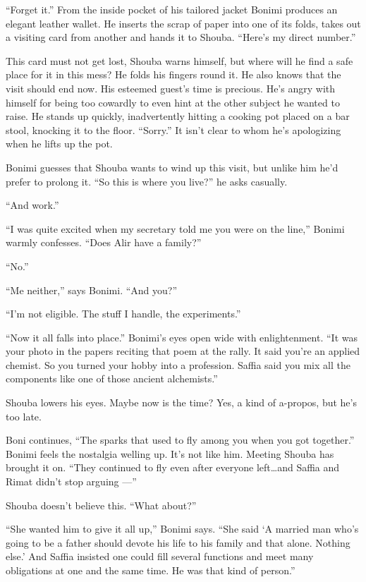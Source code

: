 \documentclass[twoside,11pt,openany]{book}
\begin{document}
``Forget it.'' From the inside pocket of his tailored jacket Bonimi produces an elegant
leather wallet. He inserts the scrap of paper into one of its folds, takes out a visiting card from another and hands
it to Shouba. ``Here's my direct number.''

This card must not get lost, Shouba warns himself, but where will he find a safe place for it in this mess? He folds his
fingers round it. He also knows that the visit should end now. His esteemed guest's time is precious.
He's{ }angry with himself for being too cowardly to even hint at the other
subject he wanted to raise. He stands up quickly, inadvertently hitting a cooking pot placed on a bar stool, knocking
it to the floor. ``Sorry.'' It isn't clear to whom he's apologizing when he lifts up the
pot.

Bonimi guesses that Shouba wants to wind up this visit, but unlike him he'd prefer to prolong it. ``So this
is where you live?''  he asks casually.

``And work.''

``I was quite excited when my secretary told me you were on the line,'' Bonimi warmly
confesses. ``Does Alir have a family?''

``No.''

``Me neither,'' says Bonimi. ``And you?''

``I'm not eligible. The stuff I handle, the experiments.''

``Now it all falls into place.'' Bonimi's eyes open wide with enlightenment. ``It
was your photo in the papers reciting that poem at the rally. It said you're an applied chemist. So you turned your
hobby into a profession. Saffia said you mix all the components like one of those ancient alchemists.''

Shouba lowers his eyes. Maybe now is the time? Yes, a kind of \hbox{a-propos},
but he's too late.

Boni continues, ``The sparks that used to fly among you when you got together.'' Bonimi feels
the nostalgia welling up. It's not like him. Meeting Shouba has brought it on. ``They continued to fly
even after everyone left{\ldots}and Saffia and Rimat didn't stop arguing ---''

Shouba doesn't believe this. ``What about?''

``She wanted {him} to give it all up,'' Bonimi says. ``She said
`A married man who's going to be a father should devote his life to his family and that alone. Nothing else.{}' And
Saffia insisted one could fill several functions and meet many obligations at one and the same time. He was that kind
of person.''
\end{document}
